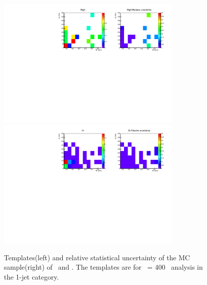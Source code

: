 \begin{figure}[htp]
\centering
\includegraphics[width=0.8\textwidth]{figures/2dtemplate_Wg3l_mH400_1j.pdf}
\includegraphics[width=0.8\textwidth]{figures/2dtemplate_Ztt_mH400_1j.pdf}
\caption{Templates(left) and relative statistical uncertainty of the MC sample(right) 
of \wgammastar\ and \ztt. 
The templates are for \mHi\ = 400 \GeV\ analysis in the 1-jet category.}
\label{fig:2dtemplate_400_1j_4}
\end{figure} 
